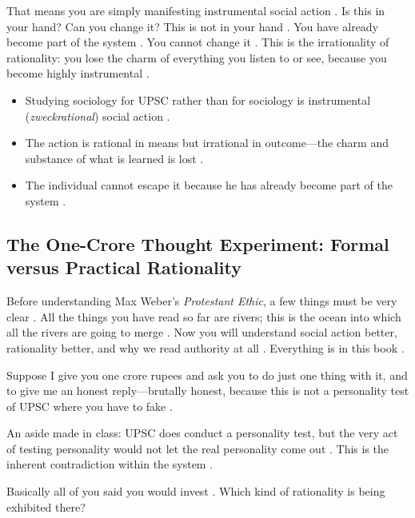\begin{CriticalPoint}
That means you are simply manifesting instrumental social action . Is this in your hand? Can you change it? This is not in your hand .
You have already become part of the system . You cannot change it .
This is the irrationality of rationality: you lose the charm of everything you listen to or see, because you become highly instrumental .
\end{CriticalPoint}

\begin{QuickRevision}
\begin{itemize}
    \item Studying sociology for UPSC rather than for sociology is instrumental (\textit{zweckrational}) social action .
    \item The action is rational in means but irrational in outcome---the charm and substance of what is learned is lost .
    \item The individual cannot escape it because he has already become part of the system .
\end{itemize}
\end{QuickRevision}

\subsection{The One-Crore Thought Experiment: Formal versus Practical Rationality}
Before understanding Max Weber's \textit{Protestant Ethic}, a few things must be very clear . All the things you have read so far are rivers; this is the ocean into which all the rivers are going to merge . Now you will understand social action better, rationality better, and why we read authority at all . Everything is in this book .

Suppose I give you one crore rupees and ask you to do just one thing with it, and to give me an honest reply---brutally honest, because this is not a personality test of UPSC where you have to fake .

\begin{CriticalPoint}
An aside made in class: UPSC does conduct a personality test, but the very act of testing personality would not let the real personality come out . This is the inherent contradiction within the system .
\end{CriticalPoint}

Basically all of you said you would invest . Which kind of rationality is being exhibited there? 

